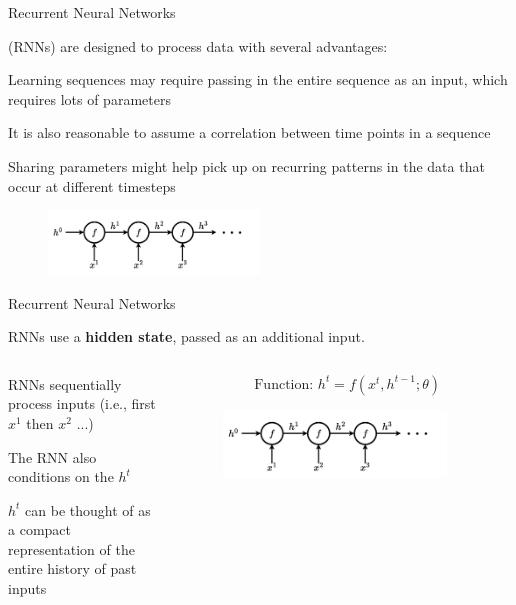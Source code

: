 \begin{frame}[t]{Recurrent Neural Networks}

 (RNNs) are designed to process  data with several advantages:

\blist
    \item Learning sequences may require passing in the entire sequence as an input, which requires lots of parameters
    \item It is also reasonable to assume a correlation between time points in a sequence
    \item Sharing parameters might help pick up on recurring patterns in the data that occur at different timesteps
\elist

\begin{figure}
    \centering
    \includegraphics[width = 0.5\textwidth, height = 0.5\textheight, keepaspectratio]{images/chapter_7/rnn.pdf}
\end{figure}
    
\end{frame}


\begin{frame}[t]{Recurrent Neural Networks}

RNNs use a \textbf{hidden state}, passed as an additional input.
\vspace{10pt}

\begin{columns}
    \begin{column}{0.5\textwidth}
    \blist
        \item RNNs sequentially process inputs (i.e., first $x^1$ then $x^2$ $...$)
        \item The RNN also conditions on the  $h^t$
        \item $h^t$ can be thought of as a compact representation of the entire history of past inputs 
    \elist
    \end{column}
    \begin{column}{0.5\textwidth}
    \[
        \text{Function:\ } h^t = f(x^t, h^{t-1}; \theta)
    \]
    \begin{figure}
    \centering
    \includegraphics[width=0.9\textwidth]{images/chapter_7/rnn.pdf}
\end{figure}
    \end{column}
\end{columns}
\end{frame}


